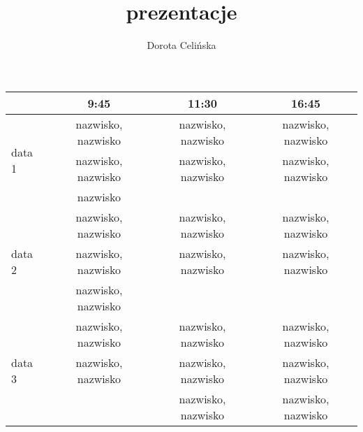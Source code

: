 \documentclass[12pt]{article}
\title{prezentacje}
\author{Dorota Celińska}
\begin{document}
\begin{landscape}
\begin{table}[h]
\begin{tabular}{|l|c|c|c|}
\hline
                           & \textbf{9:45}        & \textbf{11:30}                  & \textbf{16:45}                    \\ \hline \hline
\multirow{3}{*}{data 1}    & nazwisko, nazwisko   & nazwisko, nazwisko              & nazwisko, nazwisko                \\ \cline{2-4} 
                           & nazwisko, nazwisko   & nazwisko, nazwisko              & nazwisko, nazwisko                \\ \cline{2-4} 
                           & nazwisko             &                                 &                                   \\ \hline \hline
\multirow{3}{*}{data 2}    & nazwisko, nazwisko   & nazwisko, nazwisko              & nazwisko, nazwisko                \\ \cline{2-4} 
                           & nazwisko, nazwisko   & nazwisko, nazwisko              & nazwisko, nazwisko                \\ \cline{2-4} 
                           & nazwisko, nazwisko   &                                 &                                   \\ \hline \hline
\multirow{3}{*}{data 3}    & nazwisko, nazwisko   & nazwisko, nazwisko              & nazwisko, nazwisko                \\ \cline{2-4} 
                           & nazwisko, nazwisko   & nazwisko, nazwisko              & nazwisko, nazwisko                \\ \cline{2-4} 
                           &                      & nazwisko, nazwisko              & nazwisko, nazwisko                \\ \hline
\end{tabular}
\end{table}
\end{landscape}
\end{document}
